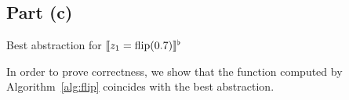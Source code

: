 \subsection{Part (c)}\label{sec:q-3-c}

\begin{algorithm}
  \caption{Best abstraction for $\llbracket z_1 = \operatorname{flip}(0.7) \rrbracket^\flat$}\label{alg:flip}
\end{algorithm}

In order to prove correctness, we show that the function computed by Algorithm~\ref{alg:flip} coincides with the best abstraction.


